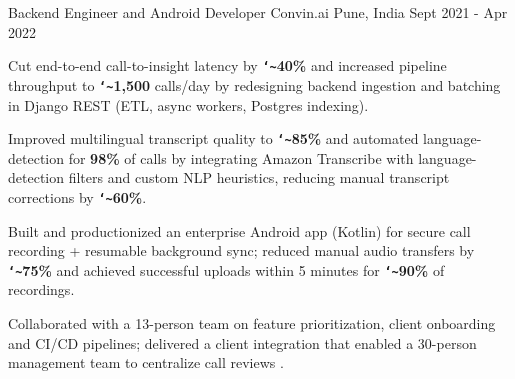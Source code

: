 \begin{cventries}
  \cventry
    {Backend Engineer and Android Developer} %
    {Convin.ai} %
    {Pune, India} %
    {Sept 2021 - Apr 2022} %
    {
      \begin{cvitems} %
        \item {Cut end-to-end call-to-insight latency by \textbf{\texttt{\char`\~}40\%} and increased pipeline throughput to \textbf{\texttt{\char`\~}1,500} calls/day by redesigning backend ingestion and batching in Django REST (ETL, async workers, Postgres indexing).}
        \item {Improved multilingual transcript quality to \textbf{\texttt{\char`\~}85\%} and automated language-detection for \textbf{98\%} of calls by integrating Amazon Transcribe with language-detection filters and custom NLP heuristics, reducing manual transcript corrections by \textbf{\texttt{\char`\~}60\%}.}
        \item {Built and productionized an enterprise Android app (Kotlin) for secure call recording + resumable background sync; reduced manual audio transfers by \textbf{\texttt{\char`\~}75\%} and achieved successful uploads within 5 minutes for \textbf{\texttt{\char`\~}90\%} of recordings.}
        \item {Collaborated with a 13-person team on feature prioritization, client onboarding and CI/CD pipelines; delivered a client integration that enabled a 30-person management team to centralize call reviews .}
      \end{cvitems}
    }
\end{cventries}
